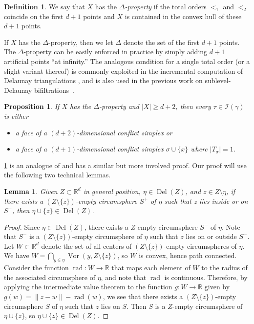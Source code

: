 \documentclass[11pt]{amsart}
\newcommand{\R}{\mathbb{R}} %
\DeclareMathOperator{\Vor}{Vor}
\DeclareMathOperator{\DelT}{Del}
\newcommand{\deff}{\emph}
\newcommand{\Incr}[0]{\mathcal{I}}
\theoremstyle{plain}
\newtheorem{lemma}[theorem]{Lemma}
\newtheorem{proposition}[theorem]{Proposition}
\theoremstyle{definition}
\newtheorem{definition}[theorem]{Definition}
\theoremstyle{remark}
\begin{document}
%
\begin{definition}
We say that $X$ has the \deff{$\Delta$-property} if the total orders $<_1$
and $<_2$ coincide on the first $d+1$ points and $X$ is contained in
the convex hull of these $d+1$ points. 
\end{definition}
%
If $X$ has the $\Delta$-property, then we let $\Delta$ denote the set of the first $d+1$ points.  
%
The $\Delta$-property can be easily enforced in practice by simply adding $d+1$ artificial points ``at
infinity.''  The analogous condition for a single total order (or a
slight variant thereof) is commonly exploited in the incremental computation of
Delaunay triangulations \cite{edelsbrunnerIncrementalTopologicalFlipping1996,
  boissonnat2009incremental,boissonnat2000triangulations}, and is also used in
the previous work on sublevel-Delaunay
bifiltrations~\cite{alonsoDelaunayBifiltrationsFunctions2024}. 
%
\begin{proposition}
\label{lem:quasi-purity} If $X$ has the $\Delta$-property and
  $|X| \geq d+2$, then every $\tau \in \Incr( \gamma)$ is either
  \begin{itemize}[noitemsep,topsep=0pt]
    \item a face of a $(d+2)$-dimensional conflict simplex or
    \item a face of a $(d+1)$-dimensional conflict simplex $\sigma \cup \{x\}$ where $|T_{\sigma}|=1$.
  \end{itemize}
\end{proposition}
%
\cref{lem:quasi-purity} is an analogue of \cite[Lemma 2.3]{alonsoDelaunayBifiltrationsFunctions2024} and has a similar but more involved proof. Our proof  will use the following two technical lemmas.
%
\begin{lemma}\label{Lem:Conflict_Technicality_1}
Given $Z\subset \R^d$ in general position, $\eta\in \DelT(Z)$, and $z\in Z\setminus \eta$, if there exists a $(Z\setminus \{z\})$-empty circumsphere $S^+$ of $\eta$ such that $z$ lies inside or on $S^+$, then $\eta\cup\{z\}\in \DelT(Z)$.  
%
\end{lemma}
%
\begin{proof}
Since $\eta\in \DelT(Z)$, there exists a $Z$-empty circumsphere $S^-$ of $\eta$.  Note that $S^-$ is a $(Z\setminus \{z\})$-empty circumsphere of $\eta$ such that $z$ lies on or outside $S^-$.  Let $W\subset \R^d$ denote the set of all centers of $(Z\setminus \{z\})$-empty circumspheres of $\eta$.  We have $W=\bigcap_{y\in \eta} \Vor(y, Z\setminus \{z\})$, so $W$ is convex, hence path connected.  Consider the function $\operatorname{rad}\colon W\to \R$ that maps each element of $W$ to the radius of the associated circumsphere of $\eta$, and note that $\operatorname{rad}$ is continuous.  Therefore, by applying the intermediate value theorem to the function $g\colon W\to \R$ given by $g(w)=\|z-w\|-\operatorname{rad}(w)$, we see that there exists a $(Z\setminus \{z\})$-empty circumsphere $S$ of $\eta$ such that $z$ lies on $S$.  Then $S$ is a $Z$-empty circumsphere of $\eta\cup\{z\}$, so $\eta\cup\{z\}\in \DelT(Z)$.  
\end{proof}
\end{document}

